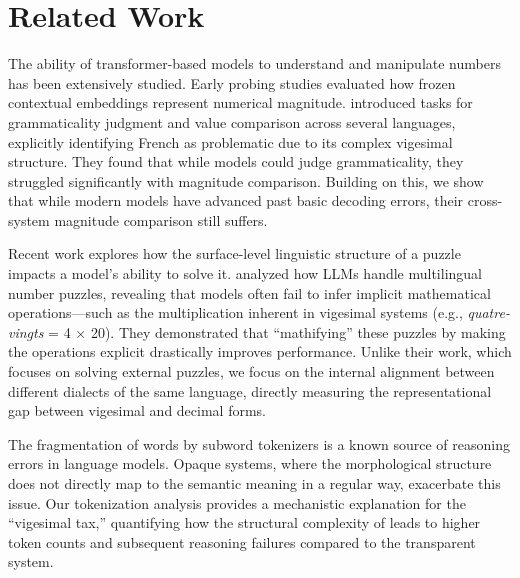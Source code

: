 \section{Related Work}

The ability of transformer-based models to understand and manipulate numbers has been extensively studied. Early probing studies evaluated how frozen contextual embeddings represent numerical magnitude. \citet{johnson2020probing} introduced tasks for grammaticality judgment and value comparison across several languages, explicitly identifying French as problematic due to its complex vigesimal structure. They found that while models could judge grammaticality, they struggled significantly with magnitude comparison. Building on this, we show that while modern models have advanced past basic decoding errors, their cross-system magnitude comparison still suffers. 

Recent work explores how the surface-level linguistic structure of a puzzle impacts a model's ability to solve it. \citet{bhattacharya2025investigating} analyzed how LLMs handle multilingual number puzzles, revealing that models often fail to infer implicit mathematical operations---such as the multiplication inherent in vigesimal systems (e.g., \textit{quatre-vingts} = 4 $\times$ 20). They demonstrated that ``mathifying'' these puzzles by making the operations explicit drastically improves performance. Unlike their work, which focuses on solving external puzzles, we focus on the internal alignment between different dialects of the same language, directly measuring the representational gap between vigesimal and decimal forms.

The fragmentation of words by subword tokenizers is a known source of reasoning errors in language models. Opaque systems, where the morphological structure does not directly map to the semantic meaning in a regular way, exacerbate this issue. Our tokenization analysis provides a mechanistic explanation for the ``vigesimal tax,'' quantifying how the structural complexity of \standardfrench leads to higher token counts and subsequent reasoning failures compared to the transparent \swissfrench system.